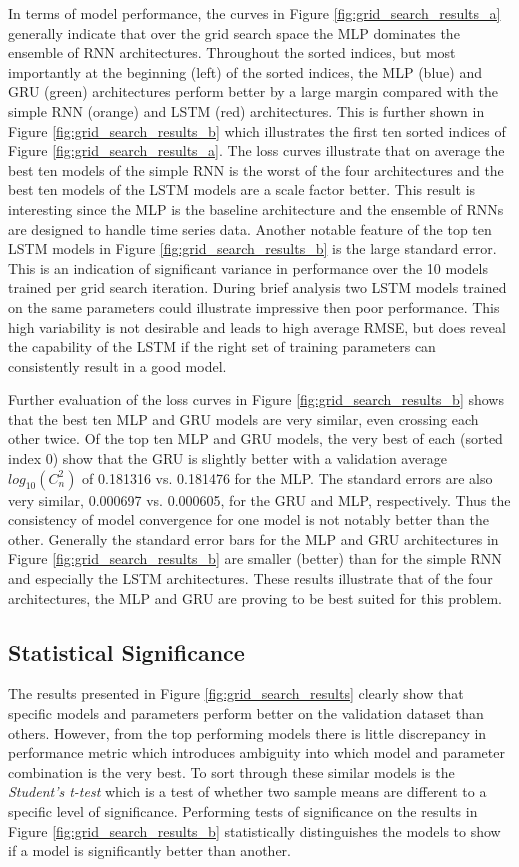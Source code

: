 In terms of model performance, the curves in Figure \ref{fig:grid_search_results_a} generally indicate that over the grid search space the MLP dominates the ensemble of RNN architectures. Throughout the sorted indices, but most importantly at the beginning (left) of the sorted indices, the MLP (blue) and GRU (green) architectures perform better by a large margin compared with the simple RNN (orange) and LSTM (red) architectures. This is further shown in Figure \ref{fig:grid_search_results_b} which illustrates the first ten sorted indices of Figure \ref{fig:grid_search_results_a}. The loss curves illustrate that on average the best ten models of the simple RNN is the worst of the four architectures and the best ten models of the LSTM models are a scale factor better. This result is interesting since the MLP is the baseline architecture and the ensemble of RNNs are designed to handle time series data. Another notable feature of the top ten LSTM models in Figure \ref{fig:grid_search_results_b} is the large standard error. This is an indication of significant variance in performance over the 10 models trained per grid search iteration. During brief analysis two LSTM models trained on the same parameters could illustrate impressive then poor performance. This high variability is not desirable and leads to high average RMSE, but does reveal the capability of the LSTM if the right set of training parameters can consistently result in a good model.

Further evaluation of the loss curves in Figure \ref{fig:grid_search_results_b} shows that the best ten MLP and GRU models are very similar, even crossing each other twice. Of the top ten MLP and GRU models, the very best of each (sorted index 0) show that the GRU is slightly better with a validation average $log_{10}(C_{n}^{2})$ of 0.181316 vs. 0.181476 for the MLP. The standard errors are also very similar, 0.000697 vs. 0.000605, for the GRU and MLP, respectively. Thus the consistency of model convergence for one model is not notably better than the other. Generally the standard error bars for the MLP and GRU architectures in Figure \ref{fig:grid_search_results_b} are smaller (better) than for the simple RNN and especially the LSTM architectures. These results illustrate that of the four architectures, the MLP and GRU are proving to be best suited for this problem.

\subsection{Statistical Significance}
The results presented in Figure \ref{fig:grid_search_results} clearly show that specific models and parameters perform better on the validation dataset than others. However, from the top performing models there is little discrepancy in performance metric which introduces ambiguity into which model and parameter combination is the very best. To sort through these similar models is the \textit{Student's t-test} which is a test of whether two sample means are different to a specific level of significance. Performing tests of significance on the results in Figure \ref{fig:grid_search_results_b} statistically distinguishes the models to show if a model is significantly better than another.

